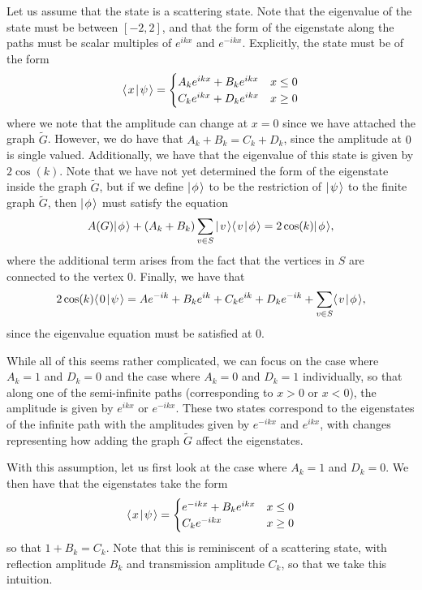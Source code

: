 \documentclass[../thesis-main/thesis-main]{subfiles}
\begin{document}
Let us assume that the state is a scattering state.  Note that the eigenvalue of the state must be between $[-2,2]$, and that the form of the eigenstate along the paths must be scalar multiples of $e^{ikx}$ and $e^{-ikx}$.  Explicitly, the state must be of the form
\begin{align}
  \langle\mspace{2mu} x \mspace{2mu} | \mspace{2mu} \psi\mspace{2mu} \rangle = \begin{cases} A_k e^{i k x} + B_k e^{i k x} & x \leq 0\\
   C_k e^{i k x} + D_k e^{i k x} & x\geq 0\end{cases}
\end{align}
where we note that the amplitude can change at $x=0$ since we have attached the graph $\widetilde{G}$.  However, we do have that $A_k + B_k=C_k +D_k$, since the amplitude at $0$ is single valued.  Additionally, we have that the eigenvalue of this state is given by $2\cos(k)$.  Note that we have not yet determined the form of the eigenstate inside the graph $\widetilde{G}$, but if we define $|\mspace{2mu} \phi \mspace{2mu} \rangle$ to be the restriction of $|\mspace{2mu} \psi \mspace{2mu} \rangle$ to the finite graph $\widetilde{G}$, then $|\mspace{2mu} \phi \mspace{2mu} \rangle$ must satisfy the equation
\begin{equation}
  A(G) |\mspace{2mu} \phi \mspace{2mu} \rangle + (A_k + B_k)\sum_{v\in S} |\mspace{2mu} v \mspace{2mu} \rangle\langle\mspace{2mu} v \mspace{2mu} | \mspace{2mu} \phi\mspace{2mu} \rangle = 2\cos(k) |\mspace{2mu} \phi \mspace{2mu} \rangle,
\end{equation}
where the additional term arises from the fact that the vertices in $S$ are connected to the vertex $0$.  Finally, we have that
\begin{equation}
  2 \cos(k)\langle\mspace{2mu} 0 \mspace{2mu} | \mspace{2mu} \psi\mspace{2mu} \rangle = Ae^{-ik} + B_k e^{ik} + C_k e^{i k} + D_k e^{-ik} + \sum_{v\in S} \langle\mspace{2mu} v \mspace{2mu} | \mspace{2mu} \phi\mspace{2mu} \rangle,
\end{equation}
since the eigenvalue equation must be satisfied at $0$.


While all of this seems rather complicated, we can focus on the case where $A_k = 1$ and $D_k=0$ and the case where $A_k = 0$ and $D_k=1$ individually, so that along one of the semi-infinite paths (corresponding to $x>0$ or $x<0$), the amplitude is given by $e^{ikx}$ or $e^{-ikx}$.  These two states correspond to the eigenstates of the infinite path with the amplitudes given by $e^{-ikx}$ and $e^{ikx}$, with changes representing how adding the graph $\widetilde{G}$ affect the eigenstates.  

With this assumption, let us first look at the case where $A_k = 1$ and $D_k = 0$.  We then have that the eigenstates take the form
\begin{align}
  \langle\mspace{2mu} x \mspace{2mu} | \mspace{2mu} \psi\mspace{2mu} \rangle = \begin{cases} e^{-ikx} + B_k e^{i kx} & x\leq 0\\
  C_k e^{-ikx} & x \geq 0\end{cases}
\end{align}
so that $1+ B_k  =C_k$.  Note that this is reminiscent of a scattering state, with reflection amplitude $B_k$ and transmission amplitude $C_k$, so that we take this intuition.  
\end{document}
